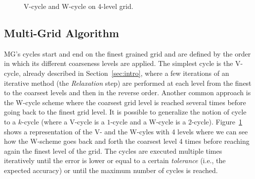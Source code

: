 
\begin{figure}[hbt]
 \resizebox{\linewidth}{!}{
    
 }
 \caption{V-cycle and W-cycle on 4-level grid.}
 \label{fig.cycles}
\end{figure}

\subsection{Multi-Grid Algorithm}
\label{sec:algo}

MG's cycles start and end on the finest grained grid and are defined by the
order in which its different coarseness levels are applied.  The simplest cycle
is the V-cycle, already described in Section~\ref{sec:intro}, where a few
iterations of an iterative method (the \textit{Relaxation} step) are performed
at each level from the finest to the coarsest levels and then in the reverse
order.  Another common approach is the W-cycle scheme where the coarsest grid
level is reached several times before going back to the finest grid level.  It is
possible to generalize the notion of cycle to a $k$-cycle (where a V-cycle is a
$1$-cycle and a W-cycle is a $2$-cycle).  Figure~\ref{fig.cycles} shows a
representation of the V- and the W-cyles with 4 levels where we can see how the
W-scheme goes back and forth the coarsest level 4 times before reaching again
the finest level of the grid.  The cycles are executed multiple times
iteratively until the error is lower or equal to a certain \emph{tolerance}
(i.e., the expected accuracy) or until the maximum number of cycles is reached.


